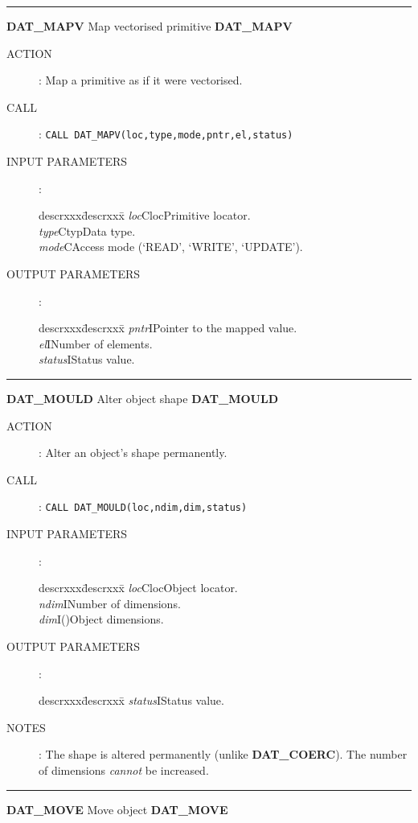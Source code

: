 \goodbreak
\rule{\textwidth}{0.3mm}
{\Large {\bf DAT\_MAPV} \hfill Map vectorised primitive \hfill {\bf DAT\_MAPV}}
\begin{description}
\item [ACTION]:
Map a primitive as if it were vectorised.
\item [CALL]:
{\tt CALL DAT\_MAPV(loc,type,mode,pntr,el,status)}
\item [INPUT PARAMETERS]:
\begin{tabbing}
descrxxx\=descrxxx\=\kill
{\em loc}\>Cloc\>Primitive locator.\\
{\em type}\>Ctyp\>Data type.\\
{\em mode}\>C\>Access mode (`READ', `WRITE', `UPDATE').
\end{tabbing}
\item [OUTPUT PARAMETERS]:
\begin{tabbing}
descrxxx\=descrxxx\=\kill
{\em pntr}\>I\>Pointer to the mapped value.\\
{\em el}\>I\>Number of elements.\\
{\em status}\>I\>Status value.
\end{tabbing}
\end{description}
\goodbreak
\rule{\textwidth}{0.3mm}
{\Large {\bf DAT\_MOULD} \hfill Alter object shape \hfill {\bf DAT\_MOULD}}
\begin{description}
\item [ACTION]:
Alter an object's shape permanently.
\item [CALL]:
{\tt CALL DAT\_MOULD(loc,ndim,dim,status)}
\item [INPUT PARAMETERS]:
\begin{tabbing}
descrxxx\=descrxxx\=\kill
{\em loc}\>Cloc\>Object locator.\\
{\em ndim}\>I\>Number of dimensions.\\
{\em dim}\>I()\>Object dimensions.
\end{tabbing}
\item [OUTPUT PARAMETERS]:
\begin{tabbing}
descrxxx\=descrxxx\=\kill
{\em status}\>I\>Status value.
\end{tabbing}
\item [NOTES]:
The shape is altered permanently (unlike {\bf DAT\_COERC}).
The number of dimensions {\em cannot} be increased.
\end{description}
\goodbreak
\rule{\textwidth}{0.3mm}
{\Large {\bf DAT\_MOVE} \hfill Move object \hfill {\bf DAT\_MOVE}}
